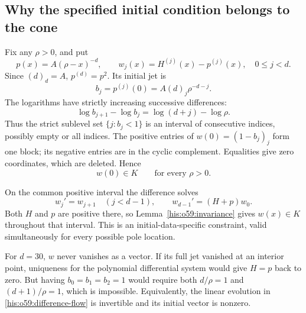 \documentclass[11pt]{article}
\theoremstyle{remark}\newtheorem{remark}[theorem]{Remark}
\numberwithin{equation}{section}
\begin{document}
\subsection{Why the specified initial condition belongs to the cone}
Fix any $\rho>0$, and put
\begin{equation}\label{his:o59:difference}
p(x)=A(\rho-x)^{-d},\qquad
w_j(x)=H^{(j)}(x)-p^{(j)}(x),\quad 0\le j<d.
\end{equation}
Since $(d)_d=A$, $p^{(d)}=p^2$. Its initial jet is
\[
b_j=p^{(j)}(0)=A(d)_j\rho^{-d-j}.
\]
The logarithms have strictly increasing successive differences:
\begin{equation}\label{his:o59:convexity}
\log b_{j+1}-\log b_j=\log(d+j)-\log\rho.
\end{equation}
Thus the strict sublevel set $\{j:b_j<1\}$ is an interval of consecutive
indices, possibly empty or all indices. The positive entries of
$w(0)=(1-b_j)_j$ form one block; its negative entries are in the cyclic
complement. Equalities give zero coordinates, which are deleted. Hence
\begin{equation}\label{his:o59:initial-cone}
w(0)\in K\qquad\text{for every }\rho>0.
\end{equation}

On the common positive interval the difference solves
\begin{equation}\label{his:o59:difference-flow}
w_j'=w_{j+1}\quad(j<d-1),\qquad
w_{d-1}'=(H+p)w_0.
\end{equation}
Both $H$ and $p$ are positive there, so Lemma~\ref{his:o59:invariance} gives
$w(x)\in K$ throughout that interval. This is an initial-data-specific
constraint, valid simultaneously for every possible pole location.

For $d=30$, $w$ never vanishes as a vector. If its full jet vanished
at an interior point, uniqueness for the polynomial differential
system would give $H=p$ back to zero. But having $b_0=b_1=b_2=1$
would require both $d/\rho=1$ and $(d+1)/\rho=1$, which is impossible.
Equivalently, the linear evolution in \eqref{his:o59:difference-flow} is
invertible and its initial vector is nonzero.
\end{document}
